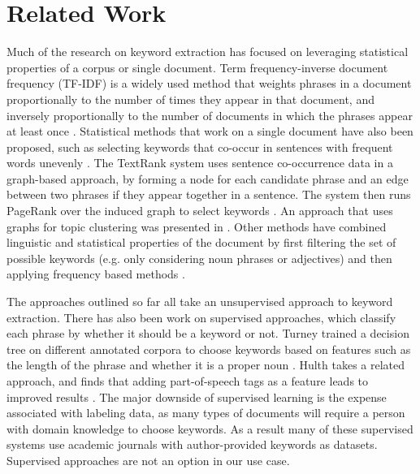 \section{Related Work}
\label{sec:relWork}

Much of the research on keyword extraction has focused on leveraging
statistical properties of a corpus or single document. Term
frequency-inverse document frequency (TF-IDF) is a widely used method
that weights phrases in a document proportionally to the number of
times they appear in that document, and inversely proportionally to
the number of documents in which the phrases appear at least once
\cite{mann2008}. Statistical methods that work on a single document
have also been proposed, such as selecting keywords that co-occur in
sentences with frequent words unevenly \cite{matsuo2004keyword}. The
TextRank system uses sentence co-occurrence data in a graph-based
approach, by forming a node for each candidate phrase and an edge
between two phrases if they appear together in a sentence. The system
then runs PageRank over the induced graph to select keywords
\cite{mihalcea2004textrank}. An approach that uses graphs for topic
clustering was presented in \cite{ohsawa1998}.  Other methods have
combined linguistic and statistical properties of the document by
first filtering the set of possible keywords (e.g. only considering
noun phrases or adjectives) and then applying frequency based methods
\cite{rose2010automatic}.

The approaches outlined so far all take an unsupervised approach to
keyword extraction. There has also been work on supervised approaches,
which classify each phrase by whether it should be a keyword or
not. Turney trained a decision tree on different annotated corpora to
choose keywords based on features such as the length of the phrase and
whether it is a proper noun \cite{turney1999learning}. Hulth takes a
related approach, and finds that adding part-of-speech tags as a
feature leads to improved results \cite{hulth2003improved}. The major
downside of supervised learning is the expense associated with
labeling data, as many types of documents will require a person with
domain knowledge to choose keywords. As a result many of these
supervised systems use academic journals with author-provided keywords
as datasets. Supervised approaches are not an option in our use case.

